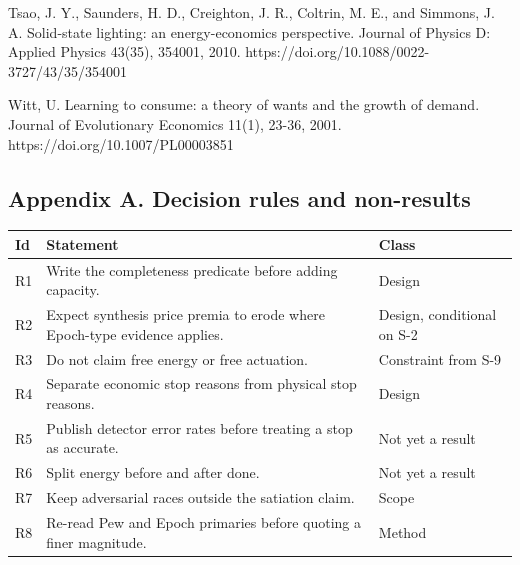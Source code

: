 \documentclass[
  10pt,
]{article}
\newcounter{none} %
\begin{document}
Tsao, J. Y., Saunders, H. D., Creighton, J. R., Coltrin, M. E., and
Simmons, J. A. Solid-state lighting: an energy-economics perspective.
Journal of Physics D: Applied Physics 43(35), 354001, 2010.
https://doi.org/10.1088/0022-3727/43/35/354001

Witt, U. Learning to consume: a theory of wants and the growth of
demand. Journal of Evolutionary Economics 11(1), 23-36, 2001.
https://doi.org/10.1007/PL00003851

\subsection{Appendix A. Decision rules and
non-results}\label{appendix-a.-decision-rules-and-non-results}

{\def\LTcaptype{none} %
\begin{longtable}[]{@{}
  >{\raggedright\arraybackslash}p{}
  >{\raggedright\arraybackslash}p{}
  >{\raggedright\arraybackslash}p{}@{}}
\toprule\noalign{}
\begin{minipage}[b]{\linewidth}\raggedright
Id
\end{minipage} & \begin{minipage}[b]{\linewidth}\raggedright
Statement
\end{minipage} & \begin{minipage}[b]{\linewidth}\raggedright
Class
\end{minipage} \\
\midrule\noalign{}
\endhead
\bottomrule\noalign{}
\endlastfoot
R1 & Write the completeness predicate before adding capacity. &
Design \\
R2 & Expect synthesis price premia to erode where Epoch-type evidence
applies. & Design, conditional on S-2 \\
R3 & Do not claim free energy or free actuation. & Constraint from
S-9 \\
R4 & Separate economic stop reasons from physical stop reasons. &
Design \\
R5 & Publish detector error rates before treating a stop as accurate. &
Not yet a result \\
R6 & Split energy before and after done. & Not yet a result \\
R7 & Keep adversarial races outside the satiation claim. & Scope \\
R8 & Re-read Pew and Epoch primaries before quoting a finer magnitude. &
Method \\
\end{longtable}
}
\end{document}

